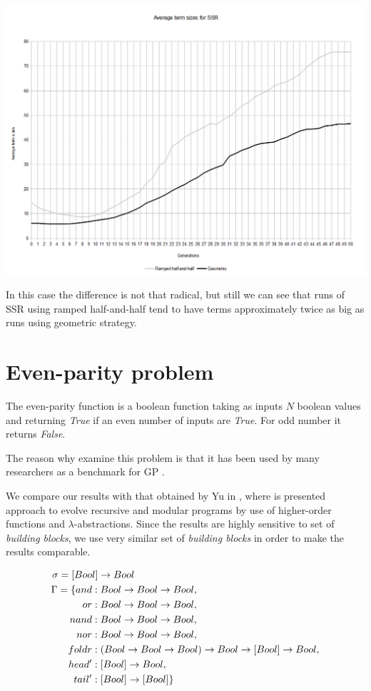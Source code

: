 \documentclass[12pt,a4paper]{report}
\begin{document}
\includegraphics[scale=0.5]{reports/SSR/ts.png}


In this case the difference is not that radical, but still we can see
that runs of SSR using ramped half-and-half tend to have terms approximately twice
as big as runs using geometric strategy.

\newpage	
\section{Even-parity problem}
The even-parity function is a boolean function taking as inputs $N$
boolean values and returning \textit{True} if an even number of inputs 
are \textit{True}. For odd number it returns \textit{False}.

The reason why examine this problem is that it has been used by many researchers
as a benchmark for GP \cite{yu01}.

We compare our results with that obtained by Yu in \cite{yu01},
where is presented approach to evolve recursive and modular programs
by use of higher-order functions and $\lambda$-abstractions.
Since the results are highly sensitive to set of \textit{building blocks}, 
we use very similar set of \textit{building blocks} in order to make 
the results comparable. 

\begin{align*}
\sigma = [Boo&l] \rightarrow Bool\\
\Gamma = \{
  and   &: Bool \rightarrow Bool \rightarrow Bool                              ,\\
  or    &: Bool \rightarrow Bool \rightarrow Bool                              ,\\
  nand  &: Bool \rightarrow Bool \rightarrow Bool                              ,\\
  nor   &: Bool \rightarrow Bool \rightarrow Bool                              ,\\
  foldr &: (Bool \rightarrow Bool \rightarrow Bool) \rightarrow Bool \rightarrow [Bool] \rightarrow Bool ,\\
  head' &: [Bool] \rightarrow Bool                                   ,\\
  tail' &: [Bool] \rightarrow [Bool]                              \}\\
\end{align*}
\end{document}
